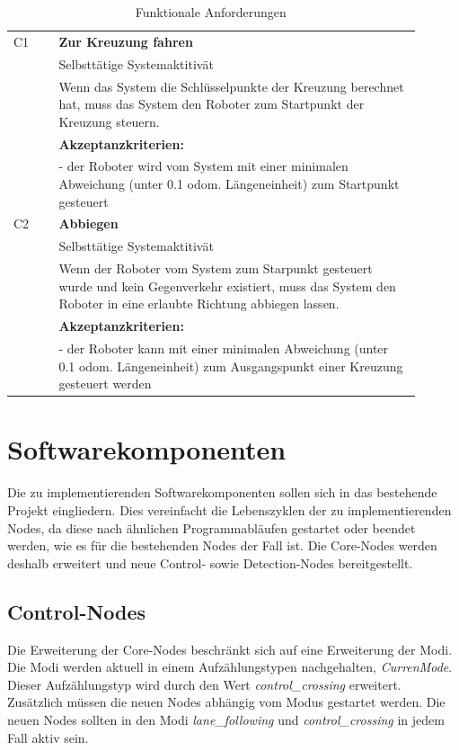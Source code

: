 \begin{table}
\begin{adjustbox}{width=\textwidth}
\begin{tabularx}{\textwidth}{@{} p{0.1\linewidth} p{0.8\linewidth} @{}}
  \hline
    C1 & \textbf{Zur Kreuzung fahren} \\*
      & Selbsttätige Systemaktitivät \\*
      & Wenn das System die Schlüsselpunkte der Kreuzung berechnet hat, muss das System den Roboter zum Startpunkt der Kreuzung steuern. \\*
      & \textbf{Akzeptanzkriterien:} \\*
      & - der Roboter wird vom System mit einer minimalen Abweichung (unter 0.1 odom. Längeneinheit) zum Startpunkt gesteuert \\
  \hline
    C2 & \textbf{Abbiegen} \\*
      & Selbsttätige Systemaktitivät \\*
      & Wenn der Roboter vom System zum Starpunkt gesteuert wurde und kein Gegenverkehr existiert, muss das System den Roboter in eine erlaubte Richtung abbiegen lassen. \\*
      & \textbf{Akzeptanzkriterien:} \\*
      & - der Roboter kann mit einer minimalen Abweichung (unter 0.1 odom. Längeneinheit) zum Ausgangspunkt einer Kreuzung gesteuert werden \\
  \hline
  \end{tabularx}
  \end{adjustbox}
  \caption{Funktionale Anforderungen}
  \label{tab:requirements}
  \end{table}


\section{Softwarekomponenten}
Die zu implementierenden Softwarekomponenten sollen sich in das bestehende Projekt eingliedern. Dies vereinfacht die Lebenszyklen der zu implementierenden Nodes, da diese
nach ähnlichen Programmabläufen gestartet oder beendet werden, wie es für die bestehenden Nodes der Fall ist. Die Core-Nodes werden deshalb erweitert und neue Control- sowie
Detection-Nodes bereitgestellt.

\subsection{Control-Nodes}
Die Erweiterung der Core-Nodes beschränkt sich auf eine Erweiterung der Modi. Die Modi werden aktuell in einem Aufzählungstypen nachgehalten, \textit{CurrenMode}. Dieser Aufzählungstyp
wird durch den Wert \textit{control\_crossing} erweitert. Zusätzlich müssen die neuen Nodes abhängig vom Modus gestartet werden. Die neuen Nodes sollten in den Modi \textit{lane\_following}
und \textit{control\_crossing} in jedem Fall aktiv sein. 

